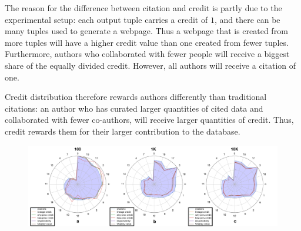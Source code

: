 The reason for the difference between citation and credit is partly due to the experimental setup:  each output tuple carries a credit of $1$, and there can be many tuples used to generate a webpage.  Thus a webpage that is created from more tuples will have a higher credit value than one created from fewer tuples. Furthermore, authors who collaborated with fewer people will receive a biggest share of the equally divided credit.  However, all authors will receive a citation of one.

Credit distribution therefore rewards authors differently than traditional citations: an author who has curated larger quantities of cited data and collaborated with fewer co-authors, will receive larger quantities of credit. Thus, credit rewards them for their larger contribution to the database. 




\begin{figure}[t]
\centering
  \includegraphics[width=1\textwidth]{figures/radar}
  \caption{
}
  \label{figure:3_radars}
\end{figure}

